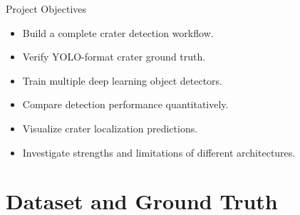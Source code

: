 \documentclass{beamer}
\begin{document}
	\begin{frame}{Project Objectives}
		
		\begin{itemize}
			\item Build a complete crater detection workflow.
			\item Verify YOLO-format crater ground truth.
			\item Train multiple deep learning object detectors.
			\item Compare detection performance quantitatively.
			\item Visualize crater localization predictions.
			\item Investigate strengths and limitations of different architectures.
		\end{itemize}
		
		\vspace{0.5cm}
		
		\begin{center}
		\end{center}
		
	\end{frame}
	
	\section{Dataset and Ground Truth}
	
\end{document}
